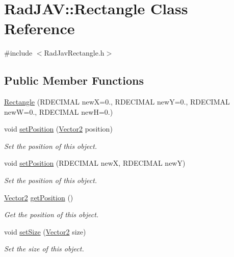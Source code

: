 \hypertarget{class_rad_j_a_v_1_1_rectangle}{}\section{Rad\+J\+AV\+:\+:Rectangle Class Reference}
\label{class_rad_j_a_v_1_1_rectangle}


{\ttfamily \#include $<$Rad\+Jav\+Rectangle.\+h$>$}

\subsection*{Public Member Functions}
\begin{DoxyCompactItemize}
\item 
\hyperlink{class_rad_j_a_v_1_1_rectangle_aecc27ad8caf4167c8b315e84c0c014db}{Rectangle} (R\+D\+E\+C\+I\+M\+AL newX=0., R\+D\+E\+C\+I\+M\+AL newY=0., R\+D\+E\+C\+I\+M\+AL newW=0., R\+D\+E\+C\+I\+M\+AL newH=0.)
\item 
void \hyperlink{class_rad_j_a_v_1_1_rectangle_ace76e0b8faf6bf65240bf21d34fd7ee3}{set\+Position} (\hyperlink{class_rad_j_a_v_1_1_vector2}{Vector2} position)
\begin{DoxyCompactList}\small\item\em Set the position of this object. \end{DoxyCompactList}\item 
void \hyperlink{class_rad_j_a_v_1_1_rectangle_af356e5804053c3cc6efb24587679e3ed}{set\+Position} (R\+D\+E\+C\+I\+M\+AL newX, R\+D\+E\+C\+I\+M\+AL newY)
\begin{DoxyCompactList}\small\item\em Set the position of this object. \end{DoxyCompactList}\item 
\hyperlink{class_rad_j_a_v_1_1_vector2}{Vector2} \hyperlink{class_rad_j_a_v_1_1_rectangle_a0309b7e4a189b1ae82971af5fd67dcf4}{get\+Position} ()
\begin{DoxyCompactList}\small\item\em Get the position of this object. \end{DoxyCompactList}\item 
void \hyperlink{class_rad_j_a_v_1_1_rectangle_a2ab9fdf336708ee8c98e997c740b16cb}{set\+Size} (\hyperlink{class_rad_j_a_v_1_1_vector2}{Vector2} size)
\begin{DoxyCompactList}\small\item\em Set the size of this object. \end{DoxyCompactList}\item 

\end{DoxyCompactItemize}
